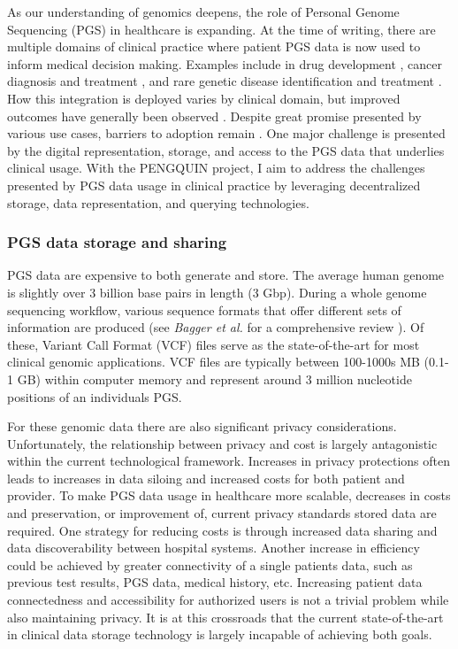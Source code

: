 \documentclass[runningheads]{llncs}
\begin{document}
As our understanding of genomics deepens, the role of Personal Genome Sequencing (PGS) in healthcare is expanding. 
At the time of writing, there are multiple domains of clinical practice where patient PGS data is now used to inform medical decision making. 
Examples include in drug development \cite{ko_new_2022}, cancer diagnosis and treatment \cite{mcleod_cancer_2013}, and rare genetic disease identification and treatment \cite{souche_recommendations_2022}.
How this integration is deployed varies by clinical domain, but improved outcomes have generally been observed \cite{mathur_personalized_2017}.
Despite great promise presented by various use cases, barriers to adoption remain \cite{stefanicka-wojtas_barriers_2023}. 
One major challenge is presented by the digital representation, storage, and access to the PGS data that underlies clinical usage.
With the PENGQUIN project, I aim to address the challenges presented by PGS data usage in clinical practice by leveraging  decentralized storage, data representation, and querying technologies.  

\subsubsection{PGS data storage and sharing} 
PGS data are expensive to both generate and store. 
The average human genome is slightly over 3 billion base pairs in length (3 Gbp). 
During a whole genome sequencing workflow, various sequence formats that offer different sets of information are produced (see \textit{Bagger et al.} for a comprehensive review \cite{bagger_whole_2024}).
Of these, Variant Call Format (VCF) files \cite{danecek_variant_2011} serve as the state-of-the-art for most clinical genomic applications.
VCF files are typically between 100-1000s MB (0.1-1 GB) within computer memory and represent around 3 million nucleotide positions of an individual\textquotesingle s PGS. 

For these genomic data there are also significant privacy considerations.
Unfortunately, the relationship between privacy and cost is largely antagonistic within the current technological framework.
Increases in privacy protections often leads to increases in data siloing and increased costs for both patient and provider.
To make PGS data usage in healthcare more scalable, decreases in costs and preservation, or improvement of, current privacy standards stored data are required.
One strategy for reducing costs is through increased data sharing and data discoverability between hospital systems.
Another increase in efficiency could be achieved by greater connectivity of a single patient\textquotesingle s data, such as previous test results, PGS data, medical history, etc.
Increasing patient data connectedness and accessibility for authorized users is not a trivial problem while also maintaining privacy.
It is at this crossroads that the current state-of-the-art in clinical data storage technology is largely incapable of achieving both goals.
\end{document}
